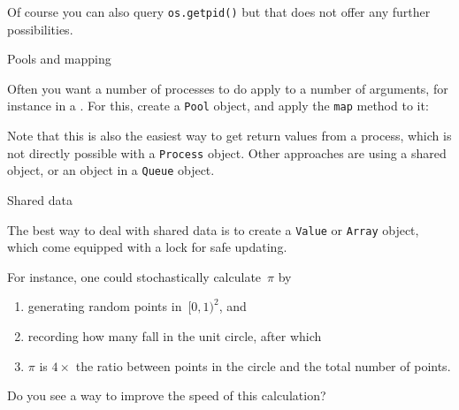 Of course you can also query \lstinline+os.getpid()+
but that does not offer any further possibilities.


 {Pools and mapping}

Often you want a number of processes to do apply to a number of arguments,
for instance in a .
For this, create a \lstinline{Pool} object,
and apply the \lstinline{map} method to it:
%

Note that this is also the easiest way to get return values from a process,
which is not directly possible with a \lstinline{Process} object.
Other approaches are using a shared object, or an object in a \lstinline{Queue} object.

 {Shared data}

The best way to deal with shared data is to create
a \lstinline{Value} or \lstinline{Array} object,
which come equipped with a lock for safe updating.


For instance, one could stochastically calculate~$\pi$
by 
\begin{enumerate}
\item generating random points in~$[0,1)^2$, and
\item recording how many fall in the unit circle, after which
\item $\pi$ is $4\times$ the ratio between points in the circle
  and the total number of points.
\end{enumerate}


\begin{exercise}
  Do you see a way to improve the speed of this calculation?
\end{exercise}
